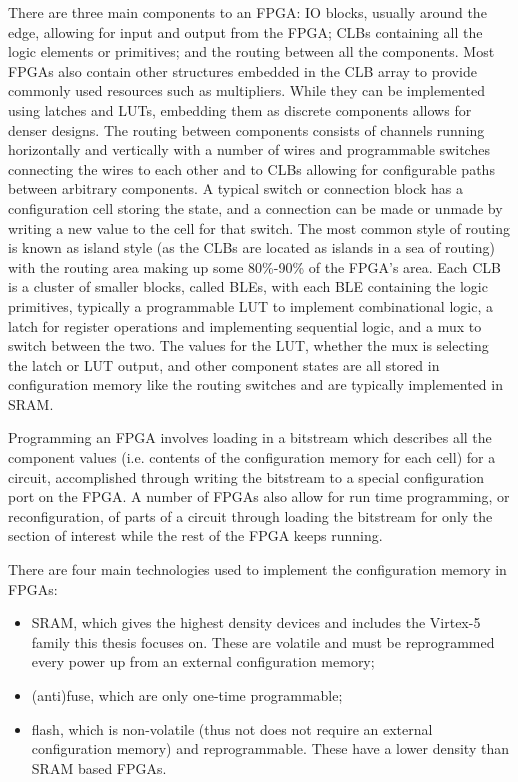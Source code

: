 \documentclass[12pt,final,oneside]{dwThesis} %
\begin{document}
   There are three main components to an \gls{FPGA}: \gls{IO} blocks, usually
   around the edge, allowing for input and output from the \gls{FPGA};
   \glspl{CLB} containing all the logic elements or \glspl{primitive}; and the
   routing between all the components.  Most \glspl{FPGA} also contain other
   structures embedded in the \gls{CLB} array to provide commonly used
   resources such as multipliers. While they can be implemented using latches
   and \glspl{LUT}, embedding them as discrete components allows for denser
   designs.  The routing between components consists of channels running
   horizontally and vertically with a number of wires and programmable switches
   connecting the wires to each other and to \glspl{CLB} allowing for
   configurable paths between arbitrary components. A typical switch or
   connection block has a configuration cell storing the state, and a
   connection can be made or unmade by writing a new value to the cell for that
   switch. The most common style of routing is known as island style (as the
   \glspl{CLB} are located as islands in a sea of routing) with the routing
   area making up some 80\%-90\% of the \gls{FPGA}'s area\cite{FPGAArch}.  Each
   \gls{CLB} is a cluster of smaller blocks, called \glspl{BLE}, with each
   \gls{BLE} containing the logic primitives, typically a programmable
   \gls{LUT} to implement combinational logic, a latch for register operations
   and implementing sequential logic, and a \gls{mux} to switch between the
   two. The values for the \gls{LUT}, whether the \gls{mux} is selecting the
   latch or \gls{LUT} output, and other component states are all stored in
   configuration memory like the routing switches and are typically implemented
   in \gls{SRAM}.

   Programming an \gls{FPGA} involves loading in a bitstream which describes
   all the component values (i.e. contents of the configuration memory for each
   cell) for a circuit, accomplished through writing the bitstream to a special
   configuration port on the \gls{FPGA}. A number of \glspl{FPGA} also allow
   for run time programming, or reconfiguration, of parts of a circuit through
   loading the bitstream for only the section of interest while the rest of the
   \gls{FPGA} keeps running.

    There are four main
   technologies used to implement the configuration memory in \glspl{FPGA}:

   \begin{itemize}

      \item \gls{SRAM}, which gives the highest density devices and includes
         the Virtex-5 family this thesis focuses on. These are volatile and
         must be reprogrammed every power up from an external configuration
         memory;
      \item (anti)fuse, which are only one-time programmable;
      \item flash, which is non-volatile (thus not does not require an external
         configuration memory) and reprogrammable. These have a lower
         density than \gls{SRAM} based \glspl{FPGA}\cite{FPGAArch}.

   \end{itemize}
\end{document}
